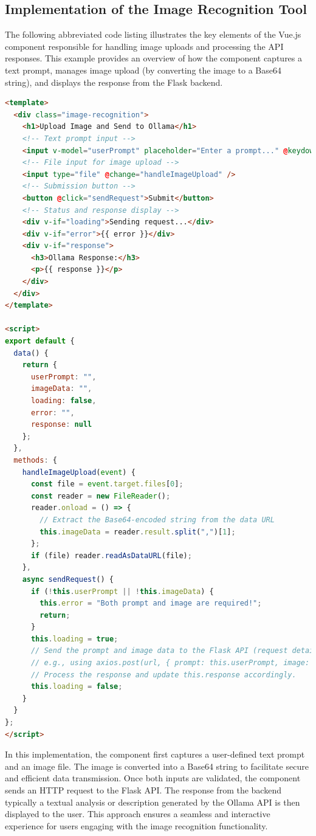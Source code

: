 \subsection{Implementation of the Image Recognition Tool}

The following abbreviated code listing illustrates the key elements of the Vue.js component responsible for handling image uploads and processing the API responses. This example provides an overview of how the component captures a text prompt, manages image upload (by converting the image to a Base64 string), and displays the response from the Flask backend.

\begin{lstlisting}[language=html, caption={Abbreviated Vue.js Component for Image Recognition}, frame=single]
<template>
  <div class="image-recognition">
    <h1>Upload Image and Send to Ollama</h1>
    <!-- Text prompt input -->
    <input v-model="userPrompt" placeholder="Enter a prompt..." @keydown.enter="sendRequest" />
    <!-- File input for image upload -->
    <input type="file" @change="handleImageUpload" />
    <!-- Submission button -->
    <button @click="sendRequest">Submit</button>
    <!-- Status and response display -->
    <div v-if="loading">Sending request...</div>
    <div v-if="error">{{ error }}</div>
    <div v-if="response">
      <h3>Ollama Response:</h3>
      <p>{{ response }}</p>
    </div>
  </div>
</template>

<script>
export default {
  data() {
    return {
      userPrompt: "",
      imageData: "",
      loading: false,
      error: "",
      response: null
    };
  },
  methods: {
    handleImageUpload(event) {
      const file = event.target.files[0];
      const reader = new FileReader();
      reader.onload = () => { 
        // Extract the Base64-encoded string from the data URL
        this.imageData = reader.result.split(",")[1];
      };
      if (file) reader.readAsDataURL(file);
    },
    async sendRequest() {
      if (!this.userPrompt || !this.imageData) {
        this.error = "Both prompt and image are required!";
        return;
      }
      this.loading = true;
      // Send the prompt and image data to the Flask API (request details omitted)
      // e.g., using axios.post(url, { prompt: this.userPrompt, image: this.imageData })
      // Process the response and update this.response accordingly.
      this.loading = false;
    }
  }
};
</script>
\end{lstlisting}

In this implementation, the component first captures a user-defined text prompt and an image file. 
The image is converted into a Base64 string to facilitate secure and efficient data transmission. Once both inputs are validated, 
the component sends an HTTP request to the Flask API. The response from the backend typically a textual analysis or description generated by the Ollama API is then displayed to the user. This approach ensures a seamless and interactive experience for users engaging with the image recognition functionality.

